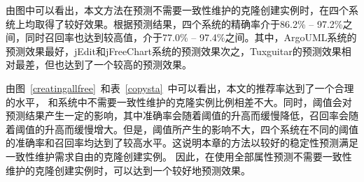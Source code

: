 由图中可以看出，本文方法在预测不需要一致性维护的克隆创建实例时，在四个系统上均取得了较好效果。根据预测结果，四个系统的精确率介于86.2\% -- 97.2\%之间，同时召回率也达到较高值，介于77.0\% -- 97.4\%之间。其中，ArgoUML系统的预测效果最好，jEdit和jFreeChart系统的预测效果次之，Tuxguitar的预测效果相对最差，但也达到了一个较高的预测效果。

由图~\ref{creatingallfree}~和表~\ref{copysta}~中可以看出，本文的推荐率达到了一个合理的水平， 和系统中不需要一致性维护的克隆实例比例相差不大。同时，阈值会对预测结果产生一定的影响，其中准确率会随着阈值的升高而缓慢降低，召回率会随着阈值的升高而缓慢增大。但是，阈值所产生的影响不大，四个系统在不同的阈值的准确率和召回率均达到了较高水平。这说明本章的方法以较好的稳定性预测满足一致性维护需求自由的克隆创建实例。
因此，在使用全部属性预测不需要一致性维护的克隆创建实例时，可以达到一个较好地预测效果。



